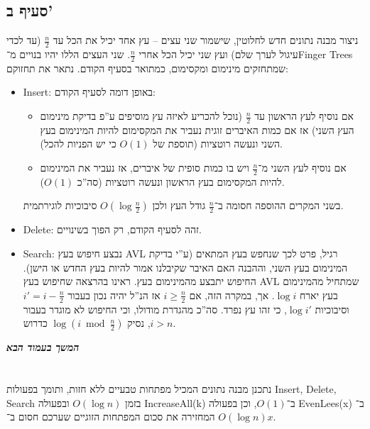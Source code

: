 \documentclass[]{article}
\newcommand\npage {\vfil {\hfil \textbf{\textit{המשך בעמוד הבא}}} \hfil \vfil \pagebreak}
\newcommand\logn  {\log n}
\newcommand\cl [1]    {\left ( #1 \right )}
\begin{document}
    \subsection*{סעיף ב'}
    ניצור מבנה נתונים חדש לחלוטין, שישמור שני עצים – עץ אחד יכיל את הכל עד $\frac{n}{2}$ (עד לכדי עיגול לערך שלם) ועץ שני יכיל הכל אחרי $\frac{n}{2}$. שני העצים הללו יהיו בנויים מ־Finger Trees שמתחזקים מינימום ומקסימום, כמתואר בסעיף הקודם. נתאר את תחזוקם: 
    \begin{itemize}
        \item Insert: באופן דומה לסעיף הקודם: 
        \begin{itemize}
            \item אם נוסיף לעץ הראשון עד $\frac{n}{2}$ (נוכל להכריע לאיזה עץ מוסיפים ע''פ בדיקת מינימום העץ השני) אז אם כמות האיברים זוגית נעביר את המקסימום להיות המינימום בעץ השני ונעשה רוטציות (תוספת של $O(1)$ כי יש הפניות להכל). 
            \item אם נוסיף לעץ השני מ־$\frac{n}{2}$ ויש בו כמות סופית של איברים, אז נעביר את המינימום להיות המקסימום בעץ הראשון ונעשה רוטציות (סה''כ $O(1)$). 
        \end{itemize}
        בשני המקרים ההוספה חסומה ב־$\frac{n}{2}$ גודל העץ ולכן $O(\log \frac{n}{2})$ סיבוכיות לוגירתמית. 
        \item Delete: זהה לסעיף הקודם, רק הפוך בשינויים. 
        \item Search: נבצע חיפוש בעץ AVL רגיל, פרט לכך שנחפש בעץ המתאים (ע''י בדיקת המינימום בעץ השני, וההבנה האם האיבר שקיבלנו אמור להיות בעץ החדש או הישן). החיפוש יתבצע מהמינימום בעץ. ראינו בהרצאה שחיפוש בעץ AVL שמתחיל מהמינימום בעץ יארח $\log i$. אך, במקרה הזה, אם $i \ge \frac{n}{2}$ אז הנ''ל יהיה נכון בעבור $i' = i - \frac{n}{2}$ וסיבוכיות $\log i'$, כי זהו עץ נפרד. סה''כ מהגדרת מודולו, וכי החיפוש לא מוגדר בעבור $i > n$, נסיק $\log\cl{i \bmod \frac{n}{2}}$ כדרוש. 
    \end{itemize}
    
    \npage
    
    \section{}
    נתכנן מבנה נתונים המכיל מפתחות טבעיים ללא חזות, ותומך בפעולות Insert, Delete, Search בזמן $O(\logn)$ ובפעולה IncreaseAll(k) ב־$O(1)$, וכן בפעולה EvenLees(x) ב־$O(\logn)$ המחזירה את סכום המפתחות הזוגיים שערכם חסום ב־$x$. 
    
\end{document}
